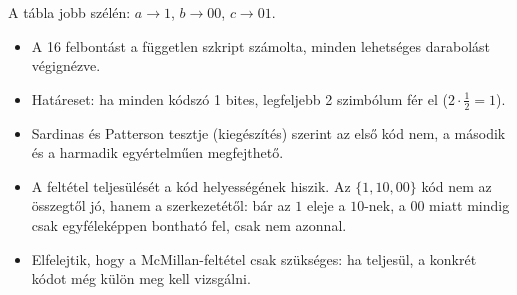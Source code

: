\begin{center}\end{center}

\begin{center}\end{center}

A tábla jobb szélén: $a\to1$, $b\to00$, $c\to01$.

\begin{center}\end{center}
\begin{eredmeny}

\begin{center}\end{center}
\end{eredmeny}
\begin{tipp}[Ellenőrzés]
\begin{itemize}
\item A 16 felbontást a független szkript számolta, minden lehetséges darabolást végignézve.
\item Határeset: ha minden kódszó 1 bites, legfeljebb 2 szimbólum fér el ($2\cdot\tfrac12=1$).
\item Sardinas és Patterson tesztje (kiegészítés) szerint az első kód nem, a második és a harmadik egyértelműen megfejthető.
\end{itemize}
\end{tipp}
\begin{figyelem}
\begin{itemize}
\item A feltétel teljesülését a kód helyességének hiszik. Az $\{1,10,00\}$ kód nem az összegtől jó, hanem a szerkezetétől: bár az $1$ eleje a $10$-nek, a $00$ miatt mindig csak egyféleképpen bontható fel, csak nem azonnal.
\item Elfelejtik, hogy a McMillan-feltétel csak szükséges: ha teljesül, a konkrét kódot még külön meg kell vizsgálni.
\end{itemize}
\end{figyelem}
